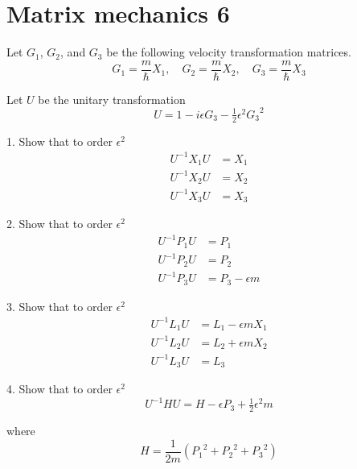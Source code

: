 

\section*{Matrix mechanics 6}

Let $G_1$, $G_2$, and $G_3$ be the following velocity transformation matrices.
\begin{equation*}
G_1=\frac{m}{\hbar}X_1,\quad G_2=\frac{m}{\hbar}X_2,\quad G_3=\frac{m}{\hbar}X_3
\end{equation*}

Let $U$ be the unitary transformation
\begin{equation*}
U=1-i\epsilon G_3-\tfrac{1}{2}\epsilon^2{G_3}^2
\end{equation*}

1. Show that to order $\epsilon^2$
\begin{align*}
U^{-1}X_1U&=X_1
\\
U^{-1}X_2U&=X_2
\\
U^{-1}X_3U&=X_3
\end{align*}

2. Show that to order $\epsilon^2$
\begin{align*}
U^{-1}P_1U&=P_1
\\
U^{-1}P_2U&=P_2
\\
U^{-1}P_3U&=P_3-\epsilon m
\end{align*}

3. Show that to order $\epsilon^2$
\begin{align*}
U^{-1}L_1U&=L_1-\epsilon mX_1
\\
U^{-1}L_2U&=L_2+\epsilon mX_2
\\
U^{-1}L_3U&=L_3
\end{align*}

4. Show that to order $\epsilon^2$
\begin{equation*}
U^{-1}HU=H-\epsilon P_3+\tfrac{1}{2}\epsilon^2m
\end{equation*}

where
\begin{equation*}
H=\frac{1}{2m}\left({P_1}^2+{P_2}^2+{P_3}^2\right)
\end{equation*}


